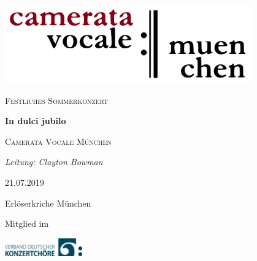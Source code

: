 \documentclass[11pt, ngermanm, titlepage]{article}
\begin{document}
	\begin{titlepage}
	\centering
	\includegraphics[width=0.8\textwidth]{img/cvlogo.png}\par\vspace{2cm}
	
	{\scshape\Large Festliches Sommerkonzert\par}
	\vspace{1.5cm}
	{\fontsize{50}{60}\bfseries\jubilo In dulci jubilo\par}
	\vspace{1.5cm}
	{\scshape\LARGE Camerata Vocale München\par}
	\vspace{1cm}
	{\Large\itshape Leitung: Clayton Bowman\par}
	\vfill
	21.07.2019\par
	Erlöserkriche München
	
	\vfill
	
	{\scriptsize Mitglied im\par}
	\includegraphics[width=0.25\textwidth]{img/vdkc_logo_klein.jpg}\par\vspace{2cm}


	\end{titlepage}

	\pagebreak

	
\end{document}
